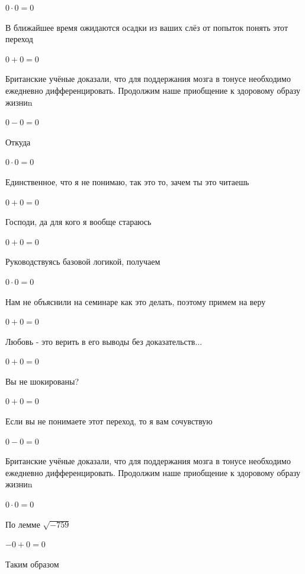 \documentclass[12pt,a4paper,fleqn]{article}
\begin{document}
\begin{center}$0 \cdot 0 = 0$\end{center}
В ближайшее время ожидаются осадки из ваших слёз от попыток понять этот переход

\begin{center}$0+0 = 0$\end{center}
Британские учёные доказали, что для поддержания мозга в тонусе необходимо ежедневно дифференцировать. Продолжим наше приобщение к здоровому образу жизниn

\begin{center}$0-0 = 0$\end{center}
Откуда

\begin{center}$0 \cdot 0 = 0$\end{center}
Единственное, что я не понимаю, так это то, зачем ты это читаешь

\begin{center}$0+0 = 0$\end{center}
Господи, да для кого я вообще стараюсь

\begin{center}$0+0 = 0$\end{center}
Руководствуясь базовой логикой, получаем

\begin{center}$0 \cdot 0 = 0$\end{center}
Нам не объяснили на семинаре как это делать, поэтому примем на веру

\begin{center}$0+0 = 0$\end{center}
Любовь - это верить в его выводы без доказательств...

\begin{center}$0+0 = 0$\end{center}
Вы не шокированы?\cite{link3}

\begin{center}$0+0 = 0$\end{center}
Если вы не понимаете этот переход, то я вам сочувствую

\begin{center}$0-0 = 0$\end{center}
Британские учёные доказали, что для поддержания мозга в тонусе необходимо ежедневно дифференцировать. Продолжим наше приобщение к здоровому образу жизниn

\begin{center}$0 \cdot 0 = 0$\end{center}
По лемме $\sqrt{-759}$
\begin{center}$-0+0 = 0$\end{center}
Таким образом
\end{document}
